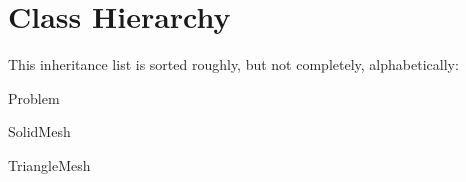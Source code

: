 \section{Class Hierarchy}
This inheritance list is sorted roughly, but not completely, alphabetically\+:\begin{DoxyCompactList}
\item Problem\begin{DoxyCompactList}
\item {}
\end{DoxyCompactList}
\item Solid\+Mesh\begin{DoxyCompactList}
\item {}
\end{DoxyCompactList}
\item Triangle\+Mesh\begin{DoxyCompactList}
\item {}
\end{DoxyCompactList}
\end{DoxyCompactList}
